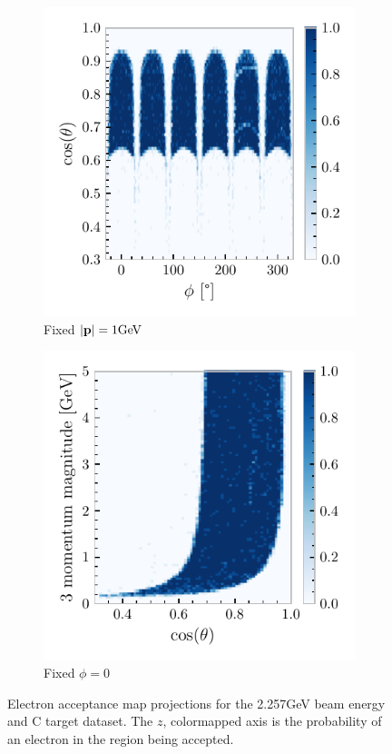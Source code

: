 \documentclass[a4paper,12pt]{article}
\begin{document}
\begin{figure}[H]
    \centering
    \begin{subfigure}[b]{0.45\textwidth}
        \centering
        \includegraphics{figures/python/el_acc1.pdf}
        \caption{Fixed $|\vb{p}| = 1\si{GeV}$}
    \end{subfigure}
    \hspace{0.5em}
    \begin{subfigure}[b]{0.45\textwidth}
        \centering
        \includegraphics{figures/python/el_acc2.pdf}
        \caption{Fixed $\phi = 0$}
    \end{subfigure}
    \caption{
        Electron acceptance map projections for the 2.257\si{GeV} beam energy and C target dataset.
        The $z$, colormapped axis is the probability of an electron in the region being accepted.
    }\label{fig:acc_map}
\end{figure}
\end{document}
